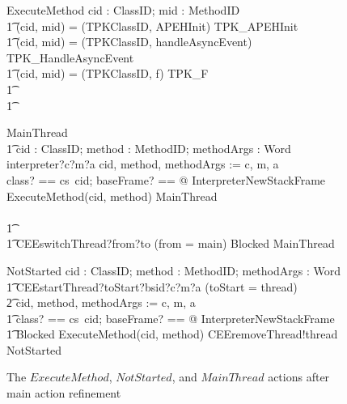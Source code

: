 \begin{figure}[t!]
  \setlength{\zedindent}{0cm}
  \setlength{\zedtab}{0.3cm}
  \setlength{\zedleftsep}{0.1cm}
  \begin{circusaction}
    ExecuteMethod \circdef \circval cid : ClassID; mid : MethodID \circspot \\
    \t1 \circif (cid, mid) = (TPKClassID, APEHInit) \circthen TPK\_APEHInit \\
    \t1 {} \circelse (cid, mid) = (TPKClassID, handleAsyncEvent) \circthen TPK\_HandleAsyncEvent \\
    \t1 {} \circelse (cid, mid) = (TPKClassID, f) \circthen TPK\_F \\
    \t1 {} \cdots {} \\
    \t1 \circfi
  \end{circusaction}
  \begin{circusaction}
    MainThread \circdef \\
    \t1 \circblockbegin
    \circvar cid : ClassID; method : MethodID; methodArgs : \seq Word \circspot \\
    interpreter?c?m?a \then cid, method, methodArgs := c, m, a \circseq  \\
    \lschexpract \exists class? == cs~cid; baseFrame? == \true @ InterpreterNewStackFrame \rschexpract \circseq \\
    ExecuteMethod(cid, method) \circseq MainThread \\
    \circblockend \\
    \t1 {} \extchoice {} \\
    \t1 CEEswitchThread?from?to \prefixcolon (from = main) \then Blocked \circseq MainThread
  \end{circusaction}
  \begin{circusaction}
    NotStarted \circdef \circvar cid : ClassID; method : MethodID; methodArgs : \seq Word \circspot \\
    \t1 CEEstartThread?toStart?bsid?c?m?a \prefixcolon (toStart = thread) \then {} \\
    \t2 cid, method, methodArgs := c, m, a \circseq \\
    \t1 \lschexpract \exists class? == cs~cid; baseFrame? == \true @ InterpreterNewStackFrame \rschexpract \circseq \\
    \t1 Blocked \circseq ExecuteMethod(cid, method) \circseq CEEremoveThread!thread \then NotStarted
  \end{circusaction}
  \caption{The $ExecuteMethod$, $NotStarted$, and $MainThread$ actions after main action refinement}
  \label{refine-main-actions-example-figure}
\end{figure}

